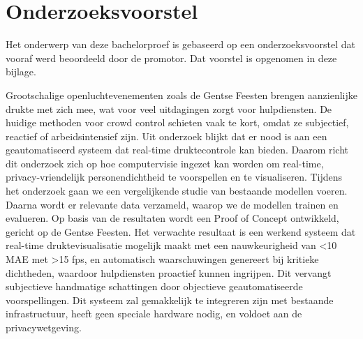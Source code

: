 \documentclass[dutch,dit,thesis]{hogentreport}
\begin{document}





%
%




\appendix

\chapter{Onderzoeksvoorstel}

Het onderwerp van deze bachelorproef is gebaseerd op een onderzoeksvoorstel dat vooraf werd beoordeeld door de promotor. Dat voorstel is opgenomen in deze bijlage.



Grootschalige openluchtevenementen zoals de Gentse Feesten brengen aanzienlijke drukte met zich mee, wat voor veel uitdagingen zorgt voor hulpdiensten. De huidige methoden voor crowd control schieten vaak te kort, omdat ze subjectief, reactief of arbeidsintensief zijn. Uit onderzoek blijkt dat er nood is aan een geautomatiseerd systeem dat real-time druktecontrole kan bieden. Daarom richt dit onderzoek zich op hoe computervisie ingezet kan worden om real-time, privacy-vriendelijk personendichtheid te voorspellen en te visualiseren. Tijdens het onderzoek gaan we een vergelijkende studie van bestaande modellen voeren. Daarna wordt er relevante data verzameld, waarop we de modellen trainen en evalueren. Op basis van de resultaten wordt een Proof of Concept ontwikkeld, gericht op de Gentse Feesten. Het verwachte resultaat is een werkend systeem dat real-time druktevisualisatie mogelijk maakt met een nauwkeurigheid van <10 MAE met >15 fps, en automatisch waarschuwingen genereert bij kritieke dichtheden, waardoor hulpdiensten proactief kunnen ingrijpen. Dit vervangt subjectieve handmatige schattingen door objectieve geautomatiseerde voorspellingen. Dit systeem zal gemakkelijk te integreren zijn met bestaande infrastructuur, heeft geen speciale hardware nodig, en voldoet aan de privacywetgeving.
\end{document}
